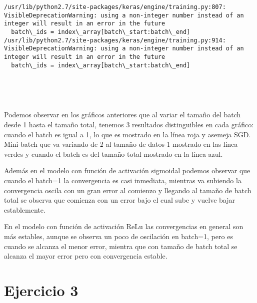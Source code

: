 \documentclass[10pt]{article}
\begin{document}
    \begin{Verbatim}[commandchars=\\\{\}]
/usr/lib/python2.7/site-packages/keras/engine/training.py:807: VisibleDeprecationWarning: using a non-integer number instead of an integer will result in an error in the future
  batch\_ids = index\_array[batch\_start:batch\_end]
/usr/lib/python2.7/site-packages/keras/engine/training.py:914: VisibleDeprecationWarning: using a non-integer number instead of an integer will result in an error in the future
  batch\_ids = index\_array[batch\_start:batch\_end]

    \end{Verbatim}

    \begin{center}
    \end{center}
    { \hspace*{\fill} \\}
    
    \begin{center}
    \end{center}
    { \hspace*{\fill} \\}
    
    Podemos observar en los gráficos anteriores que al variar el tamaño del
batch desde 1 hasta el tamaño total, tenemos 3 resultados distinguibles
en cada gráfico: cuando el batch es igual a 1, lo que es mostrado en la
línea roja y asemeja SGD. Mini-batch que va variando de 2 al tamaño de
datos-1 mostrado en las línea verdes y cuando el batch es del tamaño
total mostrado en la línea azul.

Además en el modelo con función de activación sigmoidal podemos observar
que cuando el batch=1 la convergencia es casi inmediata, mientras va
subiendo la convergencia oscila con un gran error al comienzo y llegando
al tamaño de batch total se observa que comienza con un error bajo el
cual sube y vuelve bajar establemente.

En el modelo con función de activación ReLu las convergencias en general
son más estables, aunque se observa un poco de oscilación en batch=1,
pero es cuando se alcanza el menor error, mientra que con tamaño de
batch total se alcanza el mayor error pero con convergencia estable.

    \section{Ejercicio 3}\label{ejercicio-3}
\end{document}
